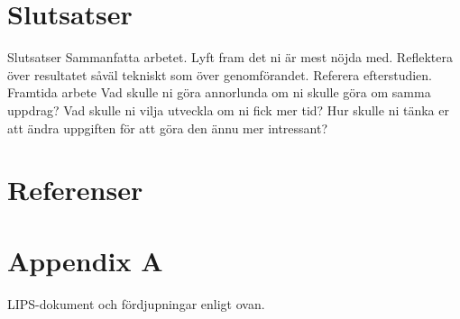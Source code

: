 \documentclass[a4paper,12pt,fleqn]{article}
\begin{document}
\section{Slutsatser}
Slutsatser
Sammanfatta arbetet. 
Lyft fram det ni är mest nöjda med.
Reflektera över resultatet såväl tekniskt som över genomförandet. Referera efterstudien.
Framtida arbete
Vad skulle ni göra annorlunda om ni skulle göra om samma uppdrag?
Vad skulle ni vilja utveckla om ni fick mer tid?
Hur skulle ni tänka er att ändra uppgiften för att göra den ännu mer intressant?
\section{Referenser}



\newpage
\appendix
\pagestyle{empty}
\section{Appendix A}
LIPS-dokument och fördjupningar enligt ovan.
\end{document}
